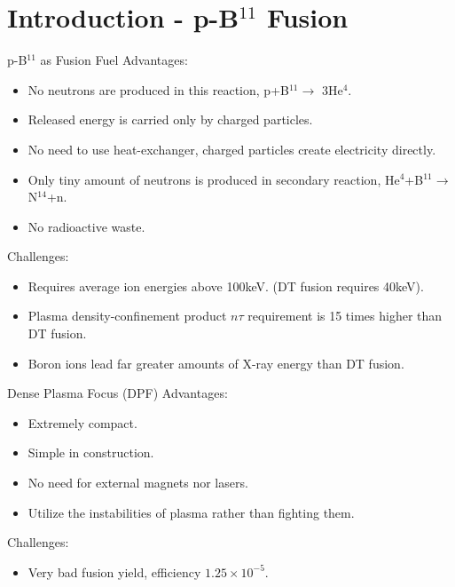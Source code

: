 \section{Introduction - p-B$^{11}$ Fusion}
\begin{frame} {p-B$^{11}$ as Fusion Fuel}
    Advantages:
    \begin{itemize}
        \item No neutrons are produced in this reaction, p+B$^{11}\to$ 3He$^4$.
        \item Released energy is carried only by charged particles.
        \item No need to use heat-exchanger, charged particles create electricity directly.
        \item Only tiny amount of neutrons is produced in secondary reaction, He$^4$+B$^{11}\to$N$^{14}$+n.
        \item No radioactive waste.
    \end{itemize}

    Challenges:
    \begin{itemize}
        \item Requires average ion energies above 100\unit{\kilo\eV}. (DT fusion requires 40\unit{\kilo\eV}).
        \item Plasma density-confinement product $n\tau$ requirement is 15 times higher than DT fusion.
        \item Boron ions lead far greater amounts of X-ray energy than DT fusion.
    \end{itemize}
\end{frame}

\begin{frame} {Dense Plasma Focus (DPF)}
    Advantages:
    \begin{itemize}
        \item Extremely compact.
        \item Simple in construction.
        \item No need for external magnets nor lasers.
        \item Utilize the instabilities of plasma rather than fighting them.
    \end{itemize}

    Challenges:
    \begin{itemize}
        \item Very bad fusion yield, efficiency $1.25\times10^{-5}$.
    \end{itemize}
\end{frame}

